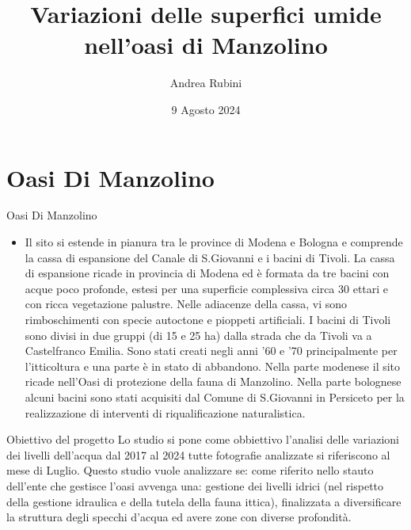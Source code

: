 \documentclass{beamer} %
\title{Variazioni delle superfici umide nell'oasi di Manzolino  }
\author{Andrea Rubini}
\date{9 Agosto 2024}
\begin{document}
\maketitle


\section{Oasi Di Manzolino}

        \begin{frame}{Oasi Di Manzolino}
            \begin{itemize}
            
                \item
                Il sito si estende in pianura tra le province di Modena e Bologna e comprende la cassa di espansione del Canale di S.Giovanni e i bacini di Tivoli. La cassa di espansione ricade in provincia di Modena ed è formata da tre bacini con acque poco profonde, estesi per una superficie complessiva circa 30 ettari e con ricca vegetazione palustre. Nelle adiacenze della cassa, vi sono rimboschimenti con specie autoctone e pioppeti artificiali. I bacini di Tivoli sono divisi in due gruppi (di 15 e 25 ha) dalla strada che da Tivoli va a Castelfranco Emilia. Sono stati creati negli anni ’60 e ’70 principalmente per l’itticoltura e una parte è in stato di abbandono. Nella parte modenese il sito ricade nell'Oasi di protezione della fauna di Manzolino. Nella parte bolognese alcuni bacini sono stati acquisiti dal Comune di S.Giovanni in Persiceto per la realizzazione di interventi di riqualificazione naturalistica.
             
              

            \end{itemize}
        \end{frame}

        \begin{frame}{Obiettivo del progetto}
                Lo studio si pone come obbiettivo l'analisi delle variazioni dei livelli dell'acqua dal 2017 al 2024 tutte fotografie analizzate si riferiscono al mese di Luglio. Questo studio vuole analizzare se: come riferito nello stauto dell'ente che gestisce l'oasi avvenga una: gestione dei livelli idrici (nel rispetto della gestione idraulica e della tutela della fauna ittica), finalizzata a diversificare la struttura degli specchi d'acqua ed avere zone con diverse profondità.
                
        \end{frame}
\end{document}
